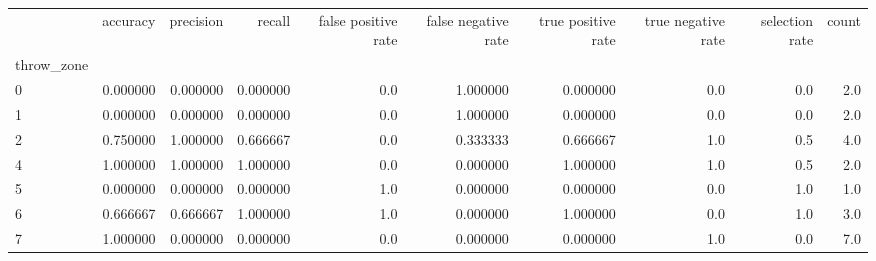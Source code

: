 \begin{tabular}{lrrrrrrrrr}
\toprule
{} &  accuracy &  precision &    recall &  false positive rate &  false negative rate &  true positive rate &  true negative rate &  selection rate &  count \\
throw\_zone &           &            &           &                      &                      &                     &                     &                 &        \\
\midrule
0          &  0.000000 &   0.000000 &  0.000000 &                  0.0 &             1.000000 &            0.000000 &                 0.0 &             0.0 &    2.0 \\
1          &  0.000000 &   0.000000 &  0.000000 &                  0.0 &             1.000000 &            0.000000 &                 0.0 &             0.0 &    2.0 \\
2          &  0.750000 &   1.000000 &  0.666667 &                  0.0 &             0.333333 &            0.666667 &                 1.0 &             0.5 &    4.0 \\
4          &  1.000000 &   1.000000 &  1.000000 &                  0.0 &             0.000000 &            1.000000 &                 1.0 &             0.5 &    2.0 \\
5          &  0.000000 &   0.000000 &  0.000000 &                  1.0 &             0.000000 &            0.000000 &                 0.0 &             1.0 &    1.0 \\
6          &  0.666667 &   0.666667 &  1.000000 &                  1.0 &             0.000000 &            1.000000 &                 0.0 &             1.0 &    3.0 \\
7          &  1.000000 &   0.000000 &  0.000000 &                  0.0 &             0.000000 &            0.000000 &                 1.0 &             0.0 &    7.0 \\
\bottomrule
\end{tabular}
